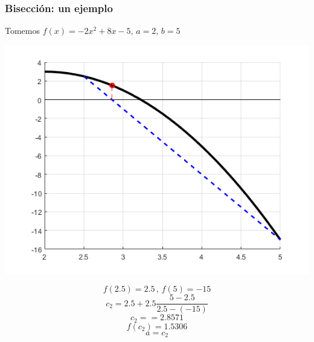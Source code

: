 \documentclass[xcolor=svgnames]{beamer} %
\theoremstyle{plain}
\theoremstyle{definition}
\begin{document}
\begin{frame}
\frametitle{Bisección: un ejemplo}
Tomemos $f(x) = -2x^2+8x-5, \, a=2, \, b=5$
\begin{minipage}{.7\linewidth}
\includegraphics[scale=.5]{FalsaPosicion/f2.png} 
\end{minipage}
\begin{minipage}{.25\linewidth}
$$f(2.5)=2.5 \,,\,f(5)=-15$$\vspace{7pt}
$$c_2 = 2.5 +2.5\frac{5-2.5}{2.5-(-15)}$$
$$c_2 = = 2.8571 $$
$$f(c_2) = 1.5306 $$\vspace{7pt}
$$ a = c_2$$

\end{minipage}
\end{frame}
\end{document}
